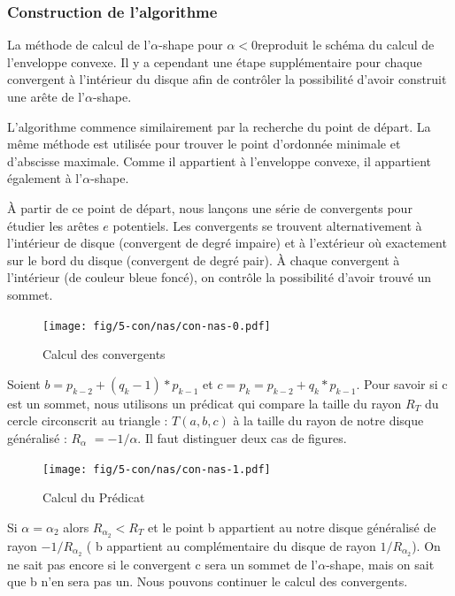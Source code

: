 \subsubsection{Construction de l'algorithme}

La méthode de calcul de l'$\alpha$-shape pour $\alpha <0 $reproduit le schéma du calcul de l’enveloppe convexe. Il y a cependant une étape supplémentaire pour chaque convergent à l'intérieur du disque afin de contrôler la possibilité d'avoir construit une arête de l'$\alpha$-shape.

L'algorithme commence similairement par la recherche du point de départ. La même méthode est utilisée pour trouver le point d'ordonnée minimale et d'abscisse maximale. Comme il appartient à l'enveloppe convexe, il appartient également à l'$\alpha$-shape.

À partir de ce point de départ, nous lançons une série de convergents pour étudier les arêtes $e$ potentiels. Les convergents se trouvent alternativement à l'intérieur de disque (convergent de degré impaire) et à l'extérieur où exactement sur le bord du disque (convergent de degré pair). À chaque convergent à l'intérieur (de couleur bleue foncé), on contrôle la possibilité d'avoir trouvé un sommet.

\begin{figure}[H]
  \centering
  \texttt{[image: fig/5-con/nas/con-nas-0.pdf]}
  \caption{Calcul des convergents}
\end{figure}

Soient  $b = p_{k-2} + (q_k - 1) * p_{k-1}$ et $c = p_k = p_{k-2} + q_k * p_{k-1}$. Pour savoir si c est un sommet, nous utilisons un prédicat qui compare la taille du rayon \textbf{$R_T$} du cercle circonscrit au triangle : $T(a, b, c)$ à la taille du rayon de notre disque généralisé : \textbf{$R_{\alpha}$} $= -1/\alpha$. Il faut distinguer deux cas de figures.\\

\begin{figure}[H]

  \centering
  \texttt{[image: fig/5-con/nas/con-nas-1.pdf]}
  \caption{Calcul du Prédicat}
\end{figure}

Si $\alpha = \alpha_{2}$ alors \textbf{$R_{\alpha_{2}} < R_T$} et le point b appartient au notre disque généralisé de rayon $-1/R_{\alpha_{2}}$ ( b appartient au complémentaire du disque de rayon $1/R_{\alpha_{2}}$). On ne sait pas encore si le convergent c sera un sommet de l'$\alpha$-shape, mais on sait que b n'en sera pas un. Nous pouvons continuer le calcul des convergents.\\ 


